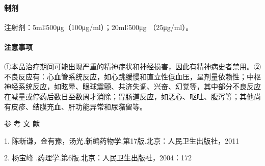 \paragraph{制剂}

注射剂：5ml∶500μg（100μg/ml）；20ml∶500μg （25μg/ml）。

\paragraph{注意事项}

①本品治疗期间可能出现严重的精神症状和神经损害，因此有精神病史者禁用。②不良反应有：心血管系统反应，如心跳缓慢和直立性低血压，呈剂量依赖性；中枢神经系统反应，如眩晕、眼球震颤、共济失调、兴奋、幻觉等，其中部分不良反应在减量或停药后数日至数周才消除；胃肠道反应，如恶心、呕吐、腹泻等；其他尚有皮疹、结膜充血、肝功能异常和尿潴留等。

\protect\hypertarget{text00440.html}{}{}

\hypertarget{text00440.htmlux5cux23CHP17-9-13}{}
参 考 文 献

1. 陈新谦，金有豫，汤光.新编药物学.第17版.北京：人民卫生出版社，2011

2. 杨宝峰 .药理学.第6版.北京：人民卫生出版社，2004：172